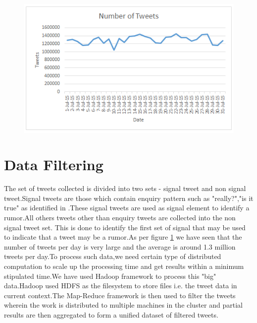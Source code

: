 			\begin{figure}[H]
				\centering
				\begin{minipage}{.7\linewidth}
					\includegraphics[width=\linewidth]{images/num_tweets.png}
					\label{img_nt}
				\end{minipage}
			\end{figure}

		\section{Data Filtering}
		\par The set of tweets collected is divided into two sets - signal tweet and non signal tweet.Signal tweets are those which contain enquiry pattern such as "really?","is it true" as identified in \cite{zhao2015enquiring}.These signal tweets are used as signal element to identify a rumor.All others tweets other than enquiry tweets are collected into the non signal tweet set.
		This is done to identify the first set of signal that may be used to indicate that a tweet may be a rumor.As per figure \ref{img_nt} we have seen that the number of tweets per day is very large and the average is around 1.3 million tweets per day.To process such data,we need certain type of distributed computation to scale up the processing time and get results within a minimum stipulated time.We have used Hadoop framework to process this "big" data.Hadoop used HDFS as the filesystem to store files i.e. the tweet data in current context.The Map-Reduce framework is then used to filter the tweets wherein the work is distributed to multiple machines in the cluster and partial results are then aggregated to form a unified dataset of filtered tweets.  
		

